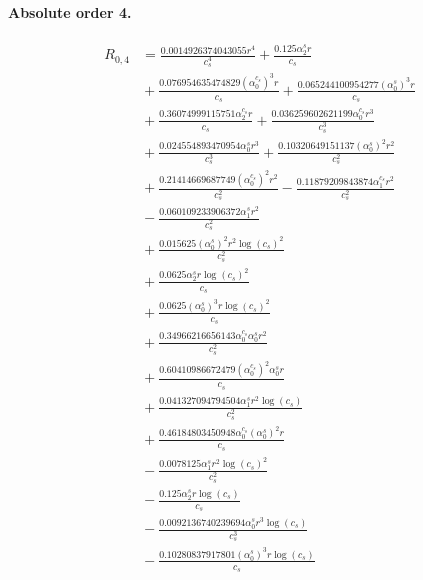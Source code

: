 \documentclass[10pt]{article}
\begin{document}
\paragraph{Absolute order 4.}
\begin{align*}
R_{0,4} &= \frac{0.0014926374043055 r^{4}}{c_{s}^{4}} + \frac{0.125 \alpha_{2}^s r}{c_{s}} \\
&{}  + \frac{0.076954635474829 \left(\alpha_{0}^{c_s}\right)^{3} r}{c_{s}} + \frac{0.065244100954277 \left(\alpha_{0}^s\right)^{3} r}{c_{s}} \\
&{}  + \frac{0.36074999115751 \alpha_{2}^{c_s} r}{c_{s}} + \frac{0.036259602621199 \alpha_{0}^{c_s} r^{3}}{c_{s}^{3}} \\
&{}  + \frac{0.024554893470954 \alpha_{0}^s r^{3}}{c_{s}^{3}} + \frac{0.10320649151137 \left(\alpha_{0}^s\right)^{2} r^{2}}{c_{s}^{2}} \\
&{}  + \frac{0.21414669687749 \left(\alpha_{0}^{c_s}\right)^{2} r^{2}}{c_{s}^{2}} - \frac{0.11879209843874 \alpha_{1}^{c_s} r^{2}}{c_{s}^{2}} \\
&{}  - \frac{0.060109233906372 \alpha_{1}^s r^{2}}{c_{s}^{2}} \\
&{}  + \frac{0.015625 \left(\alpha_{0}^s\right)^{2} r^{2} \log{\left(c_{s} \right)}^{2}}{c_{s}^{2}} \\
&{}  + \frac{0.0625 \alpha_{2}^s r \log{\left(c_{s} \right)}^{2}}{c_{s}} \\
&{}  + \frac{0.0625 \left(\alpha_{0}^s\right)^{3} r \log{\left(c_{s} \right)}^{2}}{c_{s}} \\
&{}  + \frac{0.34966216656143 \alpha_{0}^{c_s} \alpha_{0}^s r^{2}}{c_{s}^{2}} \\
&{}  + \frac{0.60410986672479 \left(\alpha_{0}^{c_s}\right)^{2} \alpha_{0}^s r}{c_{s}} \\
&{}  + \frac{0.041327094794504 \alpha_{1}^s r^{2} \log{\left(c_{s} \right)}}{c_{s}^{2}} \\
&{}  + \frac{0.46184803450948 \alpha_{0}^{c_s} \left(\alpha_{0}^s\right)^{2} r}{c_{s}} \\
&{}  - \frac{0.0078125 \alpha_{1}^s r^{2} \log{\left(c_{s} \right)}^{2}}{c_{s}^{2}} \\
&{}  - \frac{0.125 \alpha_{2}^s r \log{\left(c_{s} \right)}}{c_{s}} \\
&{}  - \frac{0.0092136740239694 \alpha_{0}^s r^{3} \log{\left(c_{s} \right)}}{c_{s}^{3}} \\
&{}  - \frac{0.10280837917801 \left(\alpha_{0}^s\right)^{3} r \log{\left(c_{s} \right)}}{c_{s}} \\

\end{align*}
\end{document}

